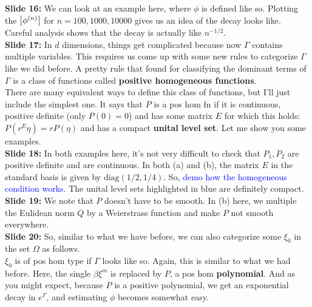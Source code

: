 \documentclass[11pt]{article}
\begin{document}
\noindent \textbf{Slide 16:} We can look at an example here, where $\phi$ is defined like so. Plotting the $\abs{\phi^{(n)}}$ for $n=100, 1000, 10000$ gives us an idea of the decay looks like. Careful analysis shows that the decay is actually like $n^{-1/2}$. \\





\noindent \textbf{Slide 17:}  In $d$ dimensions, things get complicated because now $\Gamma$ contains multiple variables. This requires us come up with some new rules to categorize $\Gamma$ like we did before. A pretty rule that found for classifying the dominant terms of $\Gamma$ is a class of functions called \textbf{positive homogeneous functions}. \\



There are many equivalent ways to define this class of functions, but I'll just include the simplest one. It says that $P$ is a pos hom fn if it is continuous, positive definite (only $P(0) = 0$) and has some matrix $E$ for which this holds: $P(r^E\eta ) = rP(\eta)$ and has a compact \textbf{unital level set}. Let me show you some examples. \\



\noindent \textbf{Slide 18:} In both examples here, it's not very difficult to check that $P_1, P_2$ are positive definite and are continuous.  In both (a) and (b), the matrix $E$ in the standard basis is given by $\text{diag}(1/2, 1/4)$. So, \textcolor{blue}{demo how the homogeneous condition works}. The unital level sets highlighted in blue are definitely compact. \\




\noindent \textbf{Slide 19:} We note that $P$ doesn't have to be smooth. In (b) here, we multiple the Eulidean norm $Q$ by a Weierstrass function and make $P$ not smooth everywhere. \\




\noindent \textbf{Slide 20:} So, similar to what we have before, we can also categorize some $\xi_0$ in the set $\Omega$ as follows.\\

$\xi_0$ is of pos hom type if $\Gamma$ looks like so. Again, this is similar to what we had before. Here, the single $\beta \xi^m$ is replaced by $P$, a pos hom \textbf{polynomial}. And as you might expect, because $P$ is a positive polynomial, we get an exponential decay in $e^\Gamma$, and estimating $\phi$ becomes somewhat easy. \\
\end{document}
